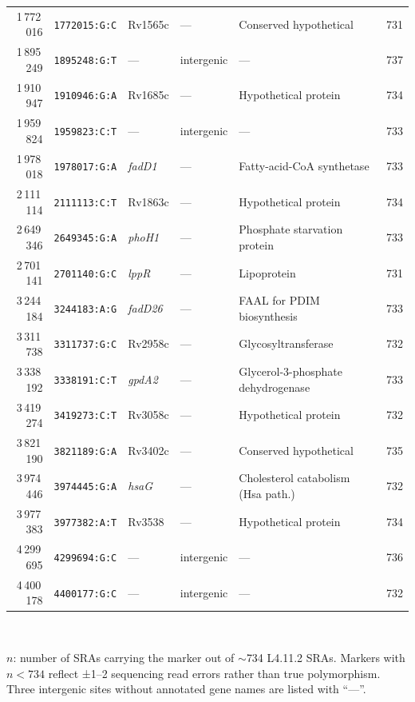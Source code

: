\documentclass[11pt,a4paper]{article}
\newcommand{\spdi}[1]{\texttt{#1}}
\newcommand{\lignee}[1]{\textsf{#1}}
\begin{document}
\begin{table}[htbp]
\begin{tabular}{rllllr}
		1\,772\,016   & \spdi{1772015:G:C} & Rv1565c              & ---             & Conserved hypothetical            & 731 \\
		1\,895\,249   & \spdi{1895248:G:T} & ---                  & intergenic      & ---                               & 737 \\
		1\,910\,947   & \spdi{1910946:G:A} & Rv1685c              & ---             & Hypothetical protein              & 734 \\
		1\,959\,824   & \spdi{1959823:C:T} & ---                  & intergenic      & ---                               & 733 \\
		1\,978\,018   & \spdi{1978017:G:A} & \textit{fadD1}       & ---             & Fatty-acid-CoA synthetase         & 733 \\
		2\,111\,114   & \spdi{2111113:C:T} & Rv1863c              & ---             & Hypothetical protein              & 734 \\
		2\,649\,346   & \spdi{2649345:G:A} & \textit{phoH1}       & ---             & Phosphate starvation protein      & 733 \\
		2\,701\,141   & \spdi{2701140:G:C} & \textit{lppR}        & ---             & Lipoprotein                       & 731 \\
		3\,244\,184   & \spdi{3244183:A:G} & \textit{fadD26}      & ---             & FAAL for PDIM biosynthesis        & 733 \\
		3\,311\,738   & \spdi{3311737:G:C} & Rv2958c              & ---             & Glycosyltransferase               & 732 \\
		3\,338\,192   & \spdi{3338191:C:T} & \textit{gpdA2}       & ---             & Glycerol-3-phosphate dehydrogenase & 733 \\
		3\,419\,274   & \spdi{3419273:C:T} & Rv3058c              & ---             & Hypothetical protein              & 732 \\
		3\,821\,190   & \spdi{3821189:G:A} & Rv3402c              & ---             & Conserved hypothetical            & 735 \\
		3\,974\,446   & \spdi{3974445:G:A} & \textit{hsaG}        & ---             & Cholesterol catabolism (Hsa path.)& 732 \\
		3\,977\,383   & \spdi{3977382:A:T} & Rv3538               & ---             & Hypothetical protein              & 734 \\
		4\,299\,695   & \spdi{4299694:G:C} & ---                  & intergenic      & ---                               & 736 \\
		4\,400\,178   & \spdi{4400177:G:C} & ---                  & intergenic      & ---                               & 732 \\
		\bottomrule
	\end{tabular}
	\medskip\\
	\parbox{0.85\textwidth}{\raggedright\scriptsize
		$n$: number of SRAs carrying the marker out of $\sim$734
		\lignee{L4.11.2} SRAs.  Markers with $n < 734$ reflect ±1--2
		sequencing read errors rather than true polymorphism.  Three
		intergenic sites without annotated gene names are listed with ``---''.}
\end{table}
\end{document}
